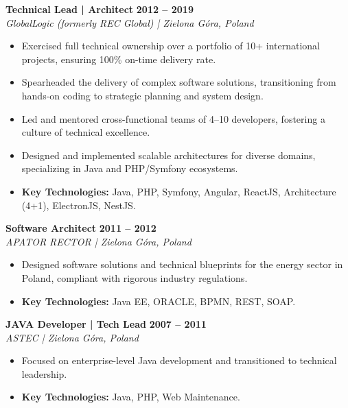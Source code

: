 \documentclass[11pt,a4paper]{article}
\begin{document}
	\vspace{8pt}
	\noindent
	\textbf{Technical Lead | Architect} \hfill \textbf{2012 -- 2019} \\
	\textit{GlobalLogic (formerly REC Global) | Zielona Góra, Poland}
	\begin{itemize}[leftmargin=*, noitemsep, topsep=4pt]
		\item Exercised full technical ownership over a portfolio of 10+ international projects, ensuring 100\% on-time delivery rate.
		\item Spearheaded the delivery of complex software solutions, transitioning from hands-on coding to strategic planning and system design.
		\item Led and mentored cross-functional teams of 4--10 developers, fostering a culture of technical excellence.
		\item Designed and implemented scalable architectures for diverse domains, specializing in Java and PHP/Symfony ecosystems.
		\item \textbf{Key Technologies:} Java, PHP, Symfony, Angular, ReactJS, Architecture (4+1), ElectronJS, NestJS.
	\end{itemize}
	
	\vspace{8pt}
	\noindent
	\textbf{Software Architect} \hfill \textbf{2011 -- 2012} \\
	\textit{APATOR RECTOR | Zielona Góra, Poland}
	\begin{itemize}[leftmargin=*, noitemsep, topsep=4pt]
		\item Designed software solutions and technical blueprints for the energy sector in Poland, compliant with rigorous industry regulations.
		\item \textbf{Key Technologies:} Java EE, ORACLE, BPMN, REST, SOAP.
	\end{itemize}
	
	\vspace{8pt}
	\noindent
	\textbf{JAVA Developer | Tech Lead} \hfill \textbf{2007 -- 2011} \\
	\textit{ASTEC | Zielona Góra, Poland}
	\begin{itemize}[leftmargin=*, noitemsep, topsep=4pt]
		\item Focused on enterprise-level Java development and transitioned to technical leadership.
		\item \textbf{Key Technologies:} Java, PHP, Web Maintenance.
	\end{itemize}
	
\end{document}

